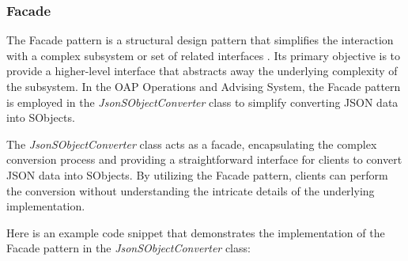 \documentclass[12pt]{article}
\begin{document}
\subsubsection{Facade}
The Facade pattern is a structural design pattern that simplifies the interaction with a complex subsystem or set of related interfaces \cite{b1}. Its primary objective is to provide a higher-level interface that abstracts away the underlying complexity of the subsystem. In the OAP Operations and Advising System, the Facade pattern is employed in the \textit{JsonSObjectConverter} class to simplify converting JSON data into SObjects.

The \textit{JsonSObjectConverter} class acts as a facade, encapsulating the complex conversion process and providing a straightforward interface for clients to convert JSON data into SObjects. By utilizing the Facade pattern, clients can perform the conversion without understanding the intricate details of the underlying implementation.

Here is an example code snippet that demonstrates the implementation of the Facade pattern in the \textit{JsonSObjectConverter} class:
\end{document}
